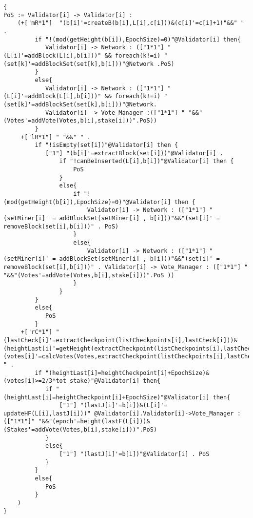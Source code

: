 \begin{lstlisting}[style=chor-color,caption={Choreographic language for the Hybrid Casper Protocol.},captionpos=b,label={ex5-code}]
{
PoS := Validator[i] -> Validator[i] :
	(+["mR*1"]  "(b[i]'=createB(b[i],L[i],c[i]))&(c[i]'=c[i]+1)"&&" " .
	     if "!(mod(getHeight(b[i]),EpochSize)=0)"@Validator[i] then{
			Validator[i] -> Network : (["1*1"] "(L[i]'=addBlock(L[i],b[i]))" && foreach(k!=i) "(set[k]'=addBlockSet(set[k],b[i]))"@Network .PoS)
		 }
		 else{
			Validator[i] -> Network : (["1*1"] "(L[i]'=addBlock(L[i],b[i]))" && foreach(k!=i) "(set[k]'=addBlockSet(set[k],b[i]))"@Network.
			Validator[i] -> Vote_Manager :(["1*1"] " "&&"(Votes'=addVote(Votes,b[i],stake[i]))".PoS))
		 }
	 +["lR*1"] " "&&" " . 
	 	 if "!isEmpty(set[i])"@Validator[i] then {
			["1"] "(b[i]'=extractBlock(set[i]))"@Validator[i] . 
				if "!canBeInserted(L[i],b[i])"@Validator[i] then {
					PoS
				}
				else{
					if "!(mod(getHeight(b[i]),EpochSize)=0)"@Validator[i] then {
						Validator[i] -> Network : (["1*1"] "(setMiner[i]' = addBlockSet(setMiner[i] , b[i]))"&&"(set[i]' = removeBlock(set[i],b[i]))" . PoS)
					}
					else{
						Validator[i] -> Network : (["1*1"] "(setMiner[i]' = addBlockSet(setMiner[i] , b[i]))"&&"(set[i]' = removeBlock(set[i],b[i]))" . Validator[i] -> Vote_Manager : (["1*1"] " "&&"(Votes'=addVote(Votes,b[i],stake[i]))".PoS ))
					}
				}
		 }
		 else{
			PoS
		 }
	 +["rC*1"] "(lastCheck[i]'=extractCheckpoint(listCheckpoints[i],lastCheck[i]))&(heightLast[i]'=getHeight(extractCheckpoint(listCheckpoints[i],lastCheck[i])))&(votes[i]'=calcVotes(Votes,extractCheckpoint(listCheckpoints[i],lastCheck[i])))"&&" " . 
	 	 if "(heightLast[i]=heightCheckpoint[i]+EpochSize)&(votes[i]>=2/3*tot_stake)"@Validator[i] then{
			if "(heightLast[i]=heightCheckpoint[i]+EpochSize)"@Validator[i] then{
				["1"] "(lastJ[i]'=b[i])&(L[i]'= updateHF(L[i],lastJ[i]))" @Validator[i].Validator[i]->Vote_Manager :(["1*1"]" "&&"(epoch'=height(lastF(L[i]))&(Stakes'=addVote(Votes,b[i],stake[i]))".PoS)
		 	}
		 	else{
				["1"] "(lastJ[i]'=b[i])"@Validator[i] . PoS
			}
		 }
		 else{
			PoS
		 }
	)								 
}	
\end{lstlisting}

